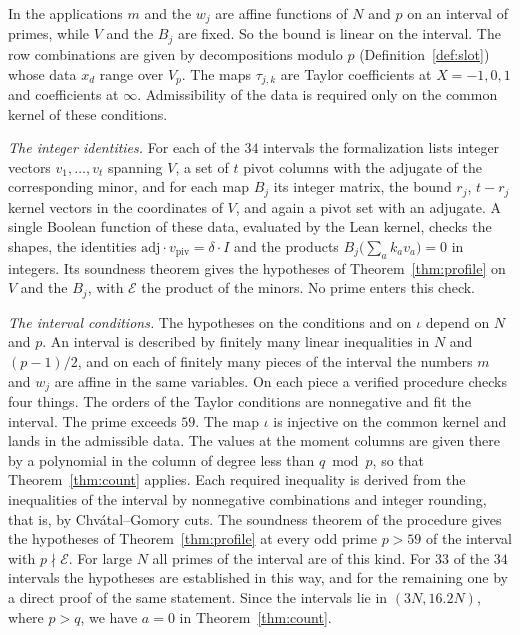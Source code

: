 In the applications $m$ and the $w_j$ are affine functions of $N$ and $p$ on an interval of primes, while $V$
and the $B_j$ are fixed. So the bound is linear on the interval. The row combinations are given by
decompositions modulo $p$ (Definition~\ref{def:slot}) whose data $x_d$ range over $V_p$. The maps $\tau_{j,k}$
are Taylor coefficients at $X=-1,0,1$ and coefficients at $\infty$. Admissibility of the data is required only
on the common kernel of these conditions.

\emph{The integer identities.} For each of the $34$ intervals the formalization lists integer vectors
$v_1,\dots,v_t$ spanning $V$, a set of $t$ pivot columns with the adjugate of the corresponding minor, and for
each map $B_j$ its integer matrix, the bound $r_j$, $t-r_j$ kernel vectors in the coordinates of $V$, and again
a pivot set with an adjugate. A single Boolean function of these data, evaluated by the Lean kernel, checks
the shapes, the identities $\mathrm{adj}\cdot v_{\mathrm{piv}}=\delta\cdot I$ and the products
$B_j\bigl(\sum_ak_av_a\bigr)=0$ in integers. Its soundness theorem gives the hypotheses of
Theorem~\ref{thm:profile} on $V$ and the $B_j$, with $\mathcal E$ the product of the minors. No prime enters this
check.

\emph{The interval conditions.} The hypotheses on the conditions and on $\iota$ depend on $N$ and $p$. An
interval is described by finitely many linear inequalities in $N$ and $(p-1)/2$, and on each of finitely many
pieces of the interval the numbers $m$ and $w_j$ are affine in the same variables. On each piece a verified
procedure checks four things. The orders of the Taylor conditions are nonnegative and fit the interval. The
prime exceeds $59$. The map $\iota$ is injective on the common kernel and lands in the admissible data. The
values at the moment columns are given there by a polynomial in the column of degree less than $q\bmod p$,
so that Theorem~\ref{thm:count} applies. Each required inequality is derived from the inequalities of the
interval by nonnegative combinations and integer rounding, that is, by Chv\'atal--Gomory cuts. The soundness
theorem of the procedure gives the hypotheses of Theorem~\ref{thm:profile} at every odd prime $p>59$ of the
interval with $p\nmid\mathcal E$. For large $N$ all primes of the interval are of this kind. For $33$ of the
$34$ intervals the hypotheses are established in this way, and for the remaining one by a direct proof of
the same statement. Since the intervals lie in $(3N,16.2N)$, where $p>q$, we have $a=0$ in
Theorem~\ref{thm:count}.

